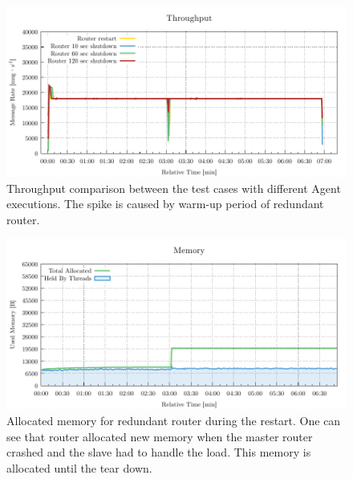 \begin{figure}[H]
	\centering
	\includegraphics[width=1\linewidth]{obrazky-figures/charts/agent-redundant-throughput.pdf}
	\caption{Throughput comparison between the test cases with different Agent executions. The spike is caused by warm-up period of redundant router.}
	\label{fig:agent-redundant-throughput}
\end{figure}

\begin{figure}[H]
	\centering
	\includegraphics[width=1\linewidth]{obrazky-figures/charts/restart-redundant-agent-memory.pdf}
	\caption{Allocated memory for redundant router during the restart. One can see that router allocated new memory when the master router crashed and the slave had to handle the load. This memory is allocated until the tear down.}
	\label{fig:agent-redundant-memory}
\end{figure}


